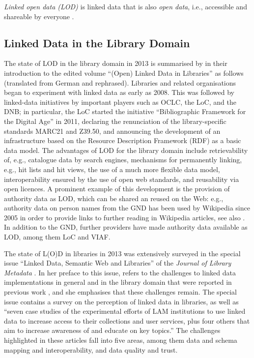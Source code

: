 \emph{Linked open data (LOD)} is linked data that is also \emph{open data},
i.e., accessible and shareable by everyone \autocite{WikiLinkedData}.




\subsection{Linked Data in the Library Domain}

The state of LOD in the library domain in 2013 is summarised by \textcite{Pohl2013}
in their introduction to the edited volume \enquote{(Open) Linked Data in Libraries} \autocite{Danowski2013}
as follows (translated from German and rephrased). Libraries and related organisations
began to experiment with linked data as early as 2008.
This was followed by linked-data initiatives by important players such as
OCLC, the \gls{LoC}, and the \gls{DNB};
in particular, the \gls{LoC} started the initiative \enquote{Bibliographic Framework for the Digital Age} in 2011,
declaring the renunciation of the library-specific standards MARC21 and Z39.50,
and announcing the development of an infrastructure based on the Resource Description Framework (RDF) as a basic data model. The advantages of LOD for the library domain include
retrievability of, e.g., catalogue data by search engines,
mechanisms for permanently linking, e.g., hit lists and hit views,
the use of a much more flexible data model,
interoperability ensured by the use of open web standards,
and reusability via open licences.
A prominent example of this development is the provision of authority data as LOD,
which can be shared an reused on the Web:
e.g., authority data on person names from the \gls{GND} has been used by Wikipedia since 2005
in order to provide links to further reading in Wikipedia articles, see also \autocite{Hengel2005}.
In addition to the \gls{GND}, further providers have made authority data available as LOD,
among them \gls{LoC} and \gls{VIAF}.

The state of L(O)D in libraries in 2013 was extensively surveyed in the special issue
\enquote{Linked Data, Semantic Web and Libraries} of the \emph{Journal of Library Metadata} \autocite{JLM13_2-3}.
In her preface to this issue, \textcite{Bair2013} refers to the challenges to linked data implementations
in general and in the library domain that were reported in previous work
\autocite{Bizer2009,Byrne2010,Gonzalez2011,Alemu2012},
and she emphasises that these challenges remain.
The special issue contains a survey on the perception of linked data in libraries,
as well as
\enquote{seven case studies of the experimental efforts of LAM institutions to use linked data to increase access to their collections and user services, plus four others that aim to increase awareness of and educate on key topics.}
The challenges highlighted in these articles fall into five areas,
among them data and schema mapping and interoperability, and data quality and trust.

